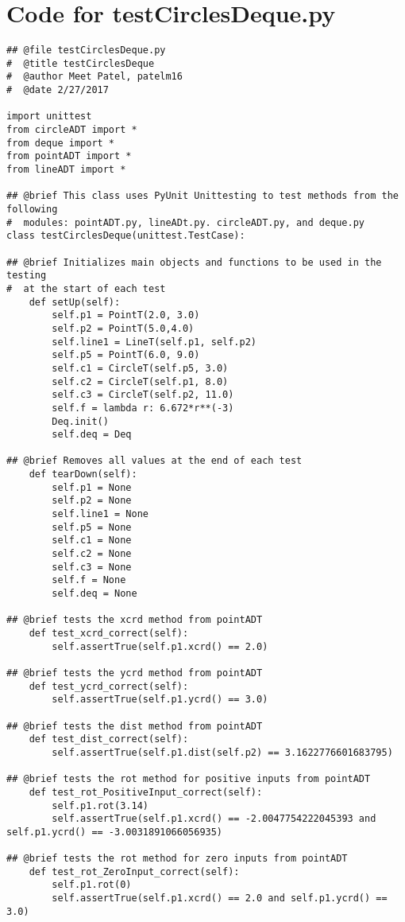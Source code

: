 \documentclass[12pt]{article}
\begin{document}
\section{Code for testCirclesDeque.py} \label{MyTestSect}
\begin{lstlisting}
## @file testCirclesDeque.py
#  @title testCirclesDeque
#  @author Meet Patel, patelm16
#  @date 2/27/2017

import unittest
from circleADT import *
from deque import *
from pointADT import *
from lineADT import *

## @brief This class uses PyUnit Unittesting to test methods from the following
#  modules: pointADT.py, lineADt.py. circleADT.py, and deque.py
class testCirclesDeque(unittest.TestCase):

## @brief Initializes main objects and functions to be used in the testing
#  at the start of each test
    def setUp(self):
        self.p1 = PointT(2.0, 3.0)
        self.p2 = PointT(5.0,4.0)
        self.line1 = LineT(self.p1, self.p2)
        self.p5 = PointT(6.0, 9.0)
        self.c1 = CircleT(self.p5, 3.0)
        self.c2 = CircleT(self.p1, 8.0)
        self.c3 = CircleT(self.p2, 11.0)
        self.f = lambda r: 6.672*r**(-3)
        Deq.init()
        self.deq = Deq

## @brief Removes all values at the end of each test
    def tearDown(self):
        self.p1 = None
        self.p2 = None
        self.line1 = None
        self.p5 = None
        self.c1 = None
        self.c2 = None
        self.c3 = None
        self.f = None
        self.deq = None

## @brief tests the xcrd method from pointADT
    def test_xcrd_correct(self):
        self.assertTrue(self.p1.xcrd() == 2.0)
        
## @brief tests the ycrd method from pointADT
    def test_ycrd_correct(self):
        self.assertTrue(self.p1.ycrd() == 3.0)

## @brief tests the dist method from pointADT
    def test_dist_correct(self):
        self.assertTrue(self.p1.dist(self.p2) == 3.1622776601683795)

## @brief tests the rot method for positive inputs from pointADT
    def test_rot_PositiveInput_correct(self):
        self.p1.rot(3.14)
        self.assertTrue(self.p1.xcrd() == -2.0047754222045393 and self.p1.ycrd() == -3.0031891066056935)

## @brief tests the rot method for zero inputs from pointADT
    def test_rot_ZeroInput_correct(self):
        self.p1.rot(0)
        self.assertTrue(self.p1.xcrd() == 2.0 and self.p1.ycrd() == 3.0)


\end{lstlisting}
\end{document}
